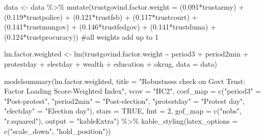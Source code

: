 \documentclass[
  letterpaper,
  DIV=11,
  numbers=noendperiod]{scrartcl}
\newenvironment{Shaded}{\begin{snugshade}}{\end{snugshade}}
\newcommand{\AttributeTok}[1]{\textcolor[rgb]{0.40,0.45,0.13}{#1}}
\newcommand{\CommentTok}[1]{\textcolor[rgb]{0.37,0.37,0.37}{#1}}
\newcommand{\ConstantTok}[1]{\textcolor[rgb]{0.56,0.35,0.01}{#1}}
\newcommand{\DecValTok}[1]{\textcolor[rgb]{0.68,0.00,0.00}{#1}}
\newcommand{\FloatTok}[1]{\textcolor[rgb]{0.68,0.00,0.00}{#1}}
\newcommand{\FunctionTok}[1]{\textcolor[rgb]{0.28,0.35,0.67}{#1}}
\newcommand{\NormalTok}[1]{\textcolor[rgb]{0.00,0.23,0.31}{#1}}
\newcommand{\OtherTok}[1]{\textcolor[rgb]{0.00,0.23,0.31}{#1}}
\newcommand{\SpecialCharTok}[1]{\textcolor[rgb]{0.37,0.37,0.37}{#1}}
\newcommand{\StringTok}[1]{\textcolor[rgb]{0.13,0.47,0.30}{#1}}
\begin{document}
\begin{Shaded}
\begin{Highlighting}[]
\NormalTok{data }\OtherTok{\textless{}{-}}\NormalTok{ data }\SpecialCharTok{\%\textgreater{}\%} 
  \FunctionTok{mutate}\NormalTok{(}\AttributeTok{trustgovind.factor.weight =}\NormalTok{ (}\FloatTok{0.091}\SpecialCharTok{*}\NormalTok{trustarmy) }\SpecialCharTok{+}\NormalTok{ (}\FloatTok{0.119}\SpecialCharTok{*}\NormalTok{trustpolice) }\SpecialCharTok{+}
\NormalTok{           (}\FloatTok{0.121}\SpecialCharTok{*}\NormalTok{trustfsb) }\SpecialCharTok{+}\NormalTok{ (}\FloatTok{0.117}\SpecialCharTok{*}\NormalTok{trustcourt) }\SpecialCharTok{+}\NormalTok{ (}\FloatTok{0.141}\SpecialCharTok{*}\NormalTok{trustmungov) }\SpecialCharTok{+} 
\NormalTok{           (}\FloatTok{0.146}\SpecialCharTok{*}\NormalTok{trustfedgov) }\SpecialCharTok{+}\NormalTok{ (}\FloatTok{0.141}\SpecialCharTok{*}\NormalTok{trustduma) }\SpecialCharTok{+}\NormalTok{ (}\FloatTok{0.124}\SpecialCharTok{*}\NormalTok{trustprocuracy))}
\CommentTok{\#all weights add up to 1}

\NormalTok{lm.factor.weighted }\OtherTok{\textless{}{-}} \FunctionTok{lm}\NormalTok{(trustgovind.factor.weight }\SpecialCharTok{\textasciitilde{}}\NormalTok{ period3 }\SpecialCharTok{+}\NormalTok{ period2min }\SpecialCharTok{+}\NormalTok{ protestday }\SpecialCharTok{+} 
\NormalTok{                           electday }\SpecialCharTok{+}\NormalTok{ wealth }\SpecialCharTok{+}\NormalTok{ education }\SpecialCharTok{+}\NormalTok{ okrug, }\AttributeTok{data =}\NormalTok{ data)}

\FunctionTok{modelsummary}\NormalTok{(lm.factor.weighted,}
             \AttributeTok{title =} \StringTok{"Robustness check on Gov\textquotesingle{}t Trust: Factor Loading Score{-}Weighted Index"}\NormalTok{,}
             \AttributeTok{vcov =} \StringTok{"HC2"}\NormalTok{,}
             \AttributeTok{coef\_map =} \FunctionTok{c}\NormalTok{(}\StringTok{"period3"} \OtherTok{=} \StringTok{"Post{-}protest"}\NormalTok{, }
             \StringTok{"period2min"} \OtherTok{=} \StringTok{"Post{-}election"}\NormalTok{, }\StringTok{"protestday"} \OtherTok{=} \StringTok{"Protest day"}\NormalTok{, }
             \StringTok{"electday"} \OtherTok{=} \StringTok{"Election day"}\NormalTok{),}
             \AttributeTok{stars =} \ConstantTok{TRUE}\NormalTok{, }\AttributeTok{fmt =} \DecValTok{2}\NormalTok{, }\AttributeTok{gof\_map =} \FunctionTok{c}\NormalTok{(}\StringTok{"nobs"}\NormalTok{, }\StringTok{"r.squared"}\NormalTok{),}
             \AttributeTok{output =} \StringTok{"kableExtra"}\NormalTok{) }\SpecialCharTok{\%\textgreater{}\%} 
   \FunctionTok{kable\_styling}\NormalTok{(}\AttributeTok{latex\_options =} \FunctionTok{c}\NormalTok{(}\StringTok{"scale\_down"}\NormalTok{, }\StringTok{"hold\_position"}\NormalTok{))}
\end{Highlighting}
\end{Shaded}
\end{document}
